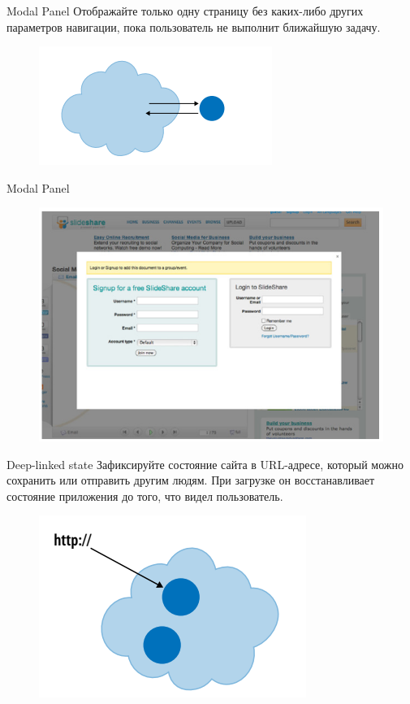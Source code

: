 \documentclass{beamer}
\begin{document}
\begin{frame}[t]{Modal Panel}
	Отображайте только одну страницу без каких-либо других параметров навигации, пока пользователь не выполнит ближайшую задачу. 
	\begin{figure}[h]
		\centering
		\includegraphics[scale=0.5]{images/lec07-pic31.png}
	\end{figure}
\end{frame}

\begin{frame}[t]{Modal Panel}
	\begin{figure}[h]
		\centering
		\includegraphics[scale=0.5]{images/lec07-pic32.png}
	\end{figure}
\end{frame}

\begin{frame}[t]{Deep-linked state}
	Зафиксируйте состояние сайта в URL-адресе, который можно сохранить или отправить другим людям. При загрузке он восстанавливает состояние приложения до того, что видел пользователь. 
	\begin{figure}[h]
		\centering
		\includegraphics[scale=0.5]{images/lec07-pic33.png}
	\end{figure}
\end{frame}
\end{document}
